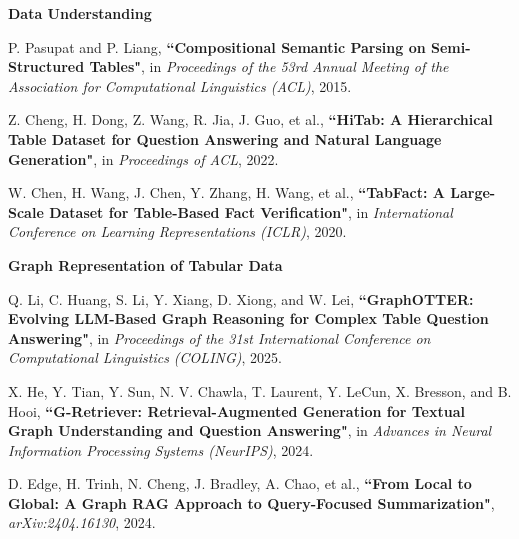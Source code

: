 \documentclass[11pt]{article}
\begin{document}
\vspace*{0.2cm}
\noindent\textbf{Data Understanding}
\begin{enumerate}[start=7,label={[S\arabic*]}]
    \item P. Pasupat and P. Liang, \textbf{``Compositional Semantic Parsing on Semi-Structured Tables"}, in {\it Proceedings of the 53rd Annual Meeting of the Association for Computational Linguistics (ACL)}, 2015.

    \item Z. Cheng, H. Dong, Z. Wang, R. Jia, J. Guo, et al., \textbf{``HiTab: A Hierarchical Table Dataset for Question Answering and Natural Language Generation"}, in {\it Proceedings of ACL}, 2022.

    \item W. Chen, H. Wang, J. Chen, Y. Zhang, H. Wang, et al., \textbf{``TabFact: A Large-Scale Dataset for Table-Based Fact Verification"}, in {\it International Conference on Learning Representations (ICLR)}, 2020.
\end{enumerate}

\vspace*{0.2cm}
\noindent\textbf{Graph Representation of Tabular Data}
\begin{enumerate}[start=10,label={[S\arabic*]}]
    \item Q. Li, C. Huang, S. Li, Y. Xiang, D. Xiong, and W. Lei, \textbf{``GraphOTTER: Evolving LLM-Based Graph Reasoning for Complex Table Question Answering"}, in {\it Proceedings of the 31st International Conference on Computational Linguistics (COLING)}, 2025.

    \item X. He, Y. Tian, Y. Sun, N. V. Chawla, T. Laurent, Y. LeCun, X. Bresson, and B. Hooi, \textbf{``G-Retriever: Retrieval-Augmented Generation for Textual Graph Understanding and Question Answering"}, in {\it Advances in Neural Information Processing Systems (NeurIPS)}, 2024.

    \item D. Edge, H. Trinh, N. Cheng, J. Bradley, A. Chao, et al., \textbf{``From Local to Global: A Graph RAG Approach to Query-Focused Summarization"}, {\it arXiv:2404.16130}, 2024.
\end{enumerate}
\end{document}
